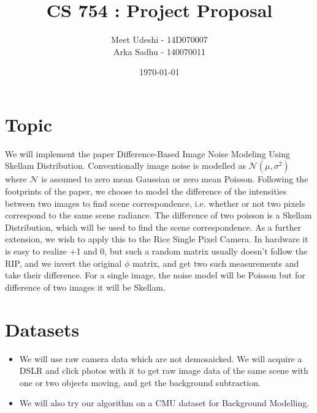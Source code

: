 \documentclass{article}
\title{CS 754 : Project Proposal}
\author{Meet Udeshi - 14D070007\\
  Arka Sadhu - 140070011\\
}
\date{\today}
\begin{document}
\maketitle
\section*{Topic}
We will implement the paper Difference-Based Image Noise Modeling Using Skellam Distribution. Conventionally image noise is modelled as $\mathcal{N}(\mu,\sigma^2)$ where $\mathcal{N}$ is assumed to zero mean Gaussian or zero mean Poisson. Following the footprints of the paper, we choose to model the difference of the intensities between two images to find scene correspondence, i.e. whether or not two pixels correspond to the same scene radiance. The difference of two poisson is a Skellam Distribution, which will be used to find the scene correspondence. As a further extension, we wish to apply this to the Rice Single Pixel Camera. In hardware it is easy to realize +1 and 0, but such a random matrix usually doesn't follow the RIP, and we invert the original $\phi$ matrix, and get two such measurements and take their difference. For a single image, the noise model will be Poisson but for difference of two images it will be Skellam.

\section*{Datasets}
\begin{itemize}
\item We will use raw camera data which are not demosaicked. We will acquire a DSLR and click photos with it to get raw image data of the same scene with one or two objects moving, and get the background subtraction.
\item We will also try our algorithm on a CMU dataset for Background Modelling.
\end{itemize}
\end{document}
